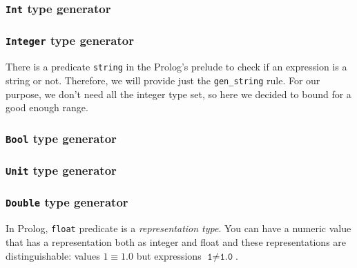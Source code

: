 \documentclass{report}
\theoremstyle{definition}
\theoremstyle{definition}
\newcommand{\ttt}[1]{\texttt{#1}}
\begin{document}
\subsubsection{\ttt{Int} type generator}

\subsubsection{\ttt{Integer} type generator}
There is a predicate \ttt{string} in the Prolog's prelude to check if an expression is a string or not. Therefore, we will provide just the \ttt{gen\_string} rule. For our purpose, we don't need all the integer type set, so here we decided to bound for a good enough range.

\subsubsection{\ttt{Bool} type generator}

\subsubsection{\ttt{Unit} type generator}

\subsubsection{\ttt{Double} type generator}
In Prolog, \ttt{float} predicate is a \textit{representation type}. You can have a numeric value that has a representation both as integer and float and these representations are distinguishable: values $1 \equiv 1.0$ but expressions $\ttt{1} \neq \ttt{1.0}$.

\end{document}
